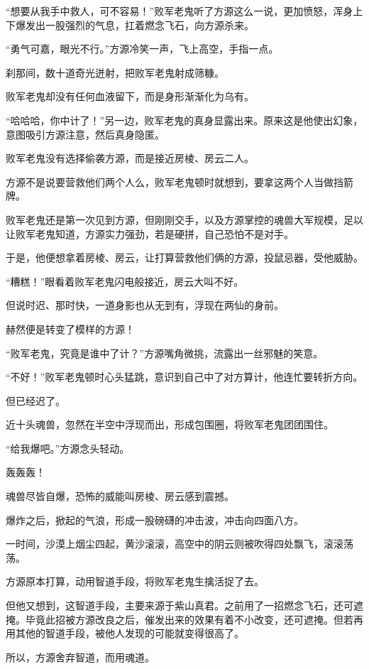 \begin{this_body}
“想要从我手中救人，可不容易！”败军老鬼听了方源这么一说，更加愤怒，浑身上下爆发出一股强烈的气息，扛着燃念飞石，向方源杀来。

“勇气可嘉，眼光不行。”方源冷笑一声，飞上高空，手指一点。

刹那间，数十道奇光迸射，把败军老鬼射成筛糠。

败军老鬼却没有任何血液留下，而是身形渐渐化为乌有。

“哈哈哈，你中计了！”另一边，败军老鬼的真身显露出来。原来这是他使出幻象，意图吸引方源注意，然后真身隐匿。

败军老鬼没有选择偷袭方源，而是接近房棱、房云二人。

方源不是说要营救他们两个人么，败军老鬼顿时就想到，要拿这两个人当做挡箭牌。

败军老鬼还是第一次见到方源，但刚刚交手，以及方源掌控的魂兽大军规模，足以让败军老鬼知道，方源实力强劲，若是硬拼，自己恐怕不是对手。

于是，他便想拿着房棱、房云，让打算营救他们俩的方源，投鼠忌器，受他威胁。

“糟糕！”眼看着败军老鬼闪电般接近，房云大叫不好。

但说时迟、那时快，一道身影也从无到有，浮现在两仙的身前。

赫然便是转变了模样的方源！

“败军老鬼，究竟是谁中了计？”方源嘴角微挑，流露出一丝邪魅的笑意。

“不好！”败军老鬼顿时心头猛跳，意识到自己中了对方算计，他连忙要转折方向。

但已经迟了。

近十头魂兽，忽然在半空中浮现而出，形成包围圈，将败军老鬼团团围住。

“给我爆吧。”方源念头轻动。

轰轰轰！

魂兽尽皆自爆，恐怖的威能叫房棱、房云感到震撼。

爆炸之后，掀起的气浪，形成一股磅礴的冲击波，冲击向四面八方。

一时间，沙漠上烟尘四起，黄沙滚滚，高空中的阴云则被吹得四处飘飞，滚滚荡荡。

方源原本打算，动用智道手段，将败军老鬼生擒活捉了去。

但他又想到，这智道手段，主要来源于紫山真君。之前用了一招燃念飞石，还可遮掩。毕竟此招被方源改良之后，催发出来的效果有着不小改变，还可遮掩。但若再用其他的智道手段，被他人发现的可能就变得很高了。

所以，方源舍弃智道，而用魂道。


\end{this_body}
